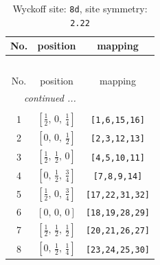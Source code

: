 \documentclass[fleqn,8pt]{jsarticle}
\begin{document}
\begin{longtable}{ccc}
\caption{Wyckoff site: {\tt 8d}, site symmetry: {\tt 2.22}}
 \\
 \hline \hline
No. & position & mapping \\ \hline \endfirsthead

\multicolumn{2}{l}{\tablename\ \thetable{}} \\
 \hline \hline
No. & position & mapping \\ \hline \endhead

 \hline \hline
\multicolumn{2}{r}{\footnotesize\it continued ...} \\ \endfoot

 \hline \hline
\multicolumn{2}{r}{} \\ \endlastfoot

1 & $\left[ \frac{1}{2},\, 0,\, \frac{1}{4} \right]$ & {\tt [1,6,15,16]} \\ \hline
2 & $\left[ 0,\, 0,\, \frac{1}{2} \right]$ & {\tt [2,3,12,13]} \\ \hline
3 & $\left[ \frac{1}{2},\, \frac{1}{2},\, 0 \right]$ & {\tt [4,5,10,11]} \\ \hline
4 & $\left[ 0,\, \frac{1}{2},\, \frac{3}{4} \right]$ & {\tt [7,8,9,14]} \\ \hline
5 & $\left[ \frac{1}{2},\, 0,\, \frac{3}{4} \right]$ & {\tt [17,22,31,32]} \\ \hline
6 & $\left[ 0,\, 0,\, 0 \right]$ & {\tt [18,19,28,29]} \\ \hline
7 & $\left[ \frac{1}{2},\, \frac{1}{2},\, \frac{1}{2} \right]$ & {\tt [20,21,26,27]} \\ \hline
8 & $\left[ 0,\, \frac{1}{2},\, \frac{1}{4} \right]$ & {\tt [23,24,25,30]} \\
\end{longtable}
\renewcommand{\arraystretch}{1.2}
\end{document}
